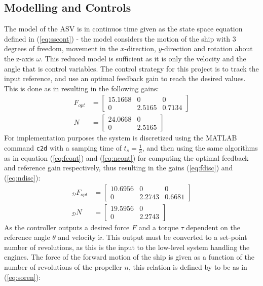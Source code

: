 \documentclass[journal]{IEEEtran}
\begin{document}
\subsection{Modelling and Controls}
The model of the ASV is in continuos time given as the state space equation defined in (\ref{eq:sscont}) - the model considers the motion of the ship with 3 degrees of freedom, movement in the $x$-direction, $y$-direction and rotation about the z-axis $\omega$. This reduced model is sufficient as it is only the velocity and the angle that is control variables. The control strategy for this project is to track the input reference, and use an optimal feedback gain to reach the desired values. This is done as in \cite{feedback} resulting in the following gains:
\begin{align}
F_{opt} &= \begin{bmatrix}
15.1668 & 0 & 0\\
0 & 2.5165 & 0.7134
\end{bmatrix}\label{eq:fcont}\\
N &=  \begin{bmatrix}
24.0668 & 0\\
0 & 2.5165
\end{bmatrix}\label{eq:ncont}
\end{align}
For implementation purposes the system is discretized using the MATLAB command \texttt{c2d} with a samping time of $t_s = \frac{1}{3}$, and then using the same algorithms as in equation (\ref{eq:fcont}) and (\ref{eq:ncont}) for computing the optimal feedback and reference gain respectively, thus resulting in the gains (\ref{eq:fdisc}) and (\ref{eq:ndisc}):
\begin{align}
_\mathcal{D}F_{opt} &= \begin{bmatrix}
10.6956 & 0 & 0\\
0 & 2.2743 & 0.6681
\end{bmatrix}\label{eq:fdisc}\\
_\mathcal{D}N &=  \begin{bmatrix}
19.5956 & 0\\
0 & 2.2743
\end{bmatrix}\label{eq:ndisc}
\end{align}
As the controller outputs a desired force $F$ and a torque $\tau$ dependent on the reference angle $\theta$ and velocity $\dot{x}$. This output must be converted to a set-point number of revolutions, as this is the input to the low-level system handling the engines. The force of the forward motion of the ship is given as a function of the number of revolutions of the propeller $n$, this relation is defined by \cite{cyber} to be as in (\ref{eq:soren}):
\end{document}
